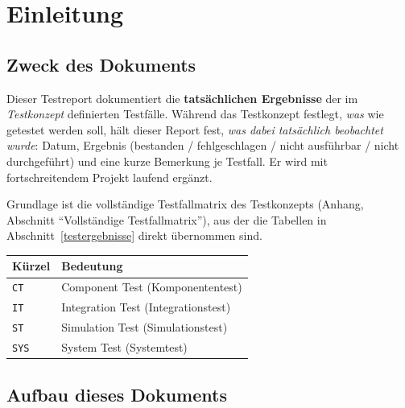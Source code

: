 \documentclass[
  a4paper,
  12pt,
  DIV=12,        %
  parskip=half,  %
  headings=small %
]{scrartcl}
\theoremstyle{definition}
\theoremstyle{definition}
\begin{document}
\newpage

\tableofcontents

\newpage

\setlength{\emergencystretch}{3em}

\section{Einleitung}\label{einleitung}

\subsection{Zweck des Dokuments}\label{zweck-des-dokuments}

Dieser Testreport dokumentiert die \textbf{tatsächlichen Ergebnisse} der im
\emph{Testkonzept} definierten Testfälle. Während das Testkonzept festlegt,
\emph{was} wie getestet werden soll, hält dieser Report fest, \emph{was
dabei tatsächlich beobachtet wurde}: Datum, Ergebnis (bestanden /
fehlgeschlagen / nicht ausführbar / nicht durchgeführt) und eine kurze
Bemerkung je Testfall. Er wird mit fortschreitendem Projekt laufend
ergänzt.

Grundlage ist die vollständige Testfallmatrix des Testkonzepts
(Anhang, Abschnitt \enquote{Vollständige Testfallmatrix}), aus der die
Tabellen in Abschnitt~\ref{testergebnisse} direkt übernommen sind.

\begin{longtable}[]{@{}p{}p{}@{}}
\toprule
\textbf{Kürzel} & \textbf{Bedeutung}\\
\midrule
\endhead
\bottomrule
\endfoot
\texttt{CT} & Component Test (Komponententest)\\
\texttt{IT} & Integration Test (Integrationstest)\\
\texttt{ST} & Simulation Test (Simulationstest)\\
\texttt{SYS} & System Test (Systemtest)\\
\end{longtable}

\subsection{Aufbau dieses Dokuments}\label{aufbau-dieses-dokuments}
\end{document}
